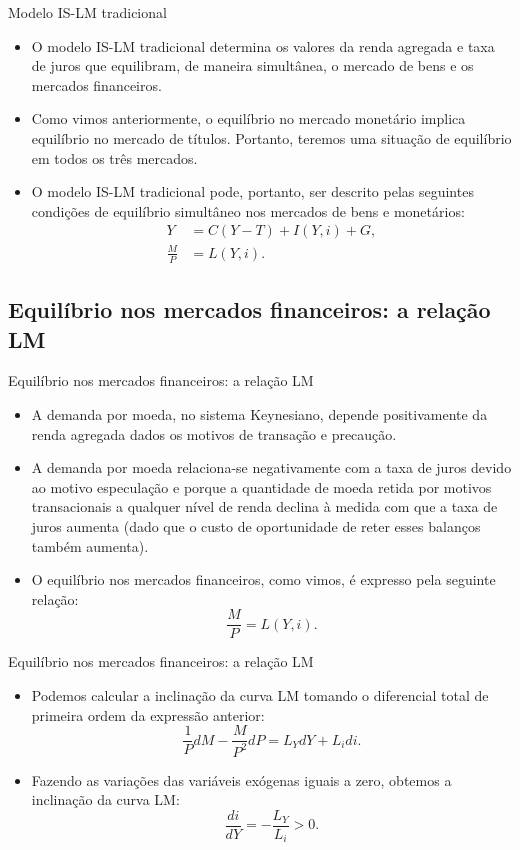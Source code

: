 \documentclass[10pt]{beamer}
\begin{document}
\begin{frame}{Modelo IS-LM tradicional}
    \begin{itemize}
        \item O modelo IS-LM tradicional determina os valores da renda agregada e taxa de juros que equilibram, de maneira simultânea, o mercado de bens e os mercados financeiros.
        \bigskip
        \item Como vimos anteriormente, o equilíbrio no mercado monetário implica equilíbrio no mercado de títulos. Portanto, teremos uma situação de equilíbrio em todos os três mercados.
        \bigskip
        \item O modelo IS-LM tradicional pode, portanto, ser descrito pelas seguintes condições de equilíbrio simultâneo nos mercados de bens e monetários:
        \begin{align}
            Y &= C(Y-T) + I(Y,i) + G, \tag{IS}\\
            \frac{M}{P} &= L(Y,i). \tag{LM}
        \end{align}
    \end{itemize}
\end{frame}

\subsection{Equilíbrio nos mercados financeiros: a relação LM}
\begin{frame}{Equilíbrio nos mercados financeiros: a relação LM}
    \begin{itemize}
        \item A demanda por moeda, no sistema Keynesiano, depende positivamente da renda agregada dados os motivos de transação e precaução.
        \bigskip
        \item A demanda por moeda relaciona-se negativamente com a taxa de juros devido ao motivo especulação e porque a quantidade de moeda retida por motivos transacionais a qualquer nível de renda declina à medida com que a taxa de juros aumenta (dado que o custo de oportunidade de reter esses balanços também aumenta).
        \bigskip
        \item O equilíbrio nos mercados financeiros, como vimos, é expresso pela seguinte relação:
        \[
        \frac{M}{P} = L(Y,i).
        \]
    \end{itemize}
\end{frame}

\begin{frame}{Equilíbrio nos mercados financeiros: a relação LM}
\begin{itemize}
    \item Podemos calcular a inclinação da curva LM tomando o diferencial total de primeira ordem da expressão anterior:
    \[
    \frac{1}{P}dM -\frac{M}{P^2}dP = L_YdY + L_idi.
    \]
    \bigskip
    \item Fazendo as variações das variáveis exógenas iguais a zero, obtemos a inclinação da curva LM:
    \[
    \frac{di}{dY} = -\frac{L_Y}{L_i} > 0.
    \]
\end{itemize}
\end{frame}
\end{document}
